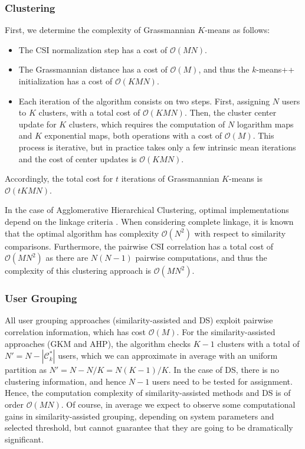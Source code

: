 \subsubsection{Clustering}
First, we determine the complexity of Grassmannian $K$-means as follows:
\begin{itemize}
\item The CSI normalization step has a cost of $\mathcal{O}(MN)$.
\item The Grassmannian distance has a cost of $\mathcal{O}(M)$, and thus the $k$-means++ initialization has a cost of $\mathcal{O}(KMN)$.
\item Each iteration of the algorithm consists on two steps. First, assigning $N$ users to $K$ clusters, with a total cost of $\mathcal{O}(KMN)$. Then, the cluster center update for $K$ clusters, which requires the computation of $N$ logarithm maps and $K$ exponential maps, both operations with a cost of $\mathcal{O}(M)$. This process is iterative, but in practice takes only a few intrinsic mean iterations and the cost of center updates is $\mathcal{O}(KMN)$.
\end{itemize}
Accordingly, the total cost for $t$ iterations of  Grassmannian $K$-means is $\mathcal{O}(tKMN)$.

In the case of Agglomerative Hierarchical Clustering, optimal implementations depend on the linkage criteria \cite{zaki14}.
When considering complete linkage, it is known that the optimal algorithm has complexity $\mathcal{O}(N^2)$ with respect to similarity comparisons. 
Furthermore, the pairwise CSI correlation has a total cost of $\mathcal{O}(MN^2)$ as there are $N(N-1)$ pairwise computations, and thus the complexity of this clustering approach is $\mathcal{O}(MN^2)$.

\subsubsection{User Grouping}
All user grouping approaches (similarity-assisted and DS) exploit pairwise correlation information, which has cost $\mathcal{O}(M)$.
For the similarity-assisted approaches (GKM and AHP), the algorithm checks $K-1$ clusters with a total of $N'=N-|\mathcal{C}_k^*|$ users, which we can approximate in average with an uniform partition as $N'=N-N/K=N(K-1)/K$. In the case of DS, there is no clustering information, and hence $N-1$ users need to be tested for assignment.
Hence, the computation complexity of similarity-assisted methods and DS is of order $\mathcal{O}(MN)$. Of course, in average we expect to observe some computational gains in similarity-assisted grouping, depending on system parameters and selected threshold, but cannot guarantee that they are going to be dramatically significant.

